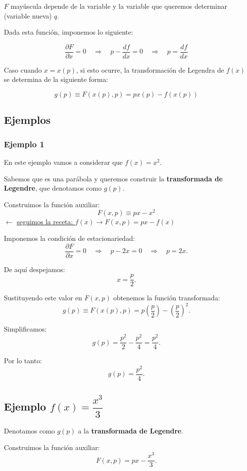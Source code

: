 \documentclass{article}
\begin{document}
$F$ mayúscula depende de la variable y la variable que queremos determinar (variable nueva) $q$.

Dada esta función, imponemos lo siguiente:

\[ \frac{ \partial F }{\partial x} =0 \quad \Rightarrow \quad p - \frac{df}{dx} =0 \quad \Rightarrow \quad \boxed{  p=\frac{df}{dx} } \]

Caso cuando $\boxed{x=x(p)}$, si esto ocurre, la transformación de Legendra de $f(x)$ se determina de la siguiente forma:

\[  g(p) \equiv F(x(p),p) = px(p)-f(x(p)) \]

\subsection{Ejemplos}

\subsubsection{Ejemplo 1}

En este ejemplo vamos a considerar que $f(x) = x^{2}$.

Sabemos que es una parábola y queremos construir la \textbf{transformada de Legendre}, que denotamos como $g(p)$.

Construimos la función auxiliar:
\[
F(x,p) \equiv px - x^{2}
\]
\hfill $\leftarrow$ \underline{seguimos la receta: } $f(x) \to F(x,p) = px - f(x)$

Imponemos la condición de estacionariedad:
\[
\frac{\partial F}{\partial x} = 0 
\quad \Rightarrow \quad 
p - 2x = 0 
\quad \Rightarrow \quad 
\boxed{p = 2x}.
\]

De aquí despejamos:
\[
x = \frac{p}{2}.
\]

Sustituyendo este valor en $F(x,p)$ obtenemos la función transformada:
\[
g(p) \equiv F(x(p),p) = p\left(\frac{p}{2}\right) - \left(\frac{p}{2}\right)^{2}.
\]

Simplificamos:
\[
g(p) = \frac{p^{2}}{2} - \frac{p^{2}}{4} = \frac{p^{2}}{4}.
\]

Por lo tanto:
\[
\boxed{g(p) = \frac{p^{2}}{4}}.
\]

\subsection{Ejemplo $f(x) = \dfrac{x^{3}}{3}$}

Denotamos como $g(p)$ a la \textbf{transformada de Legendre}.

Construimos la función auxiliar:
\[
F(x,p) = px - \frac{x^{3}}{3}.
\]
\end{document}
